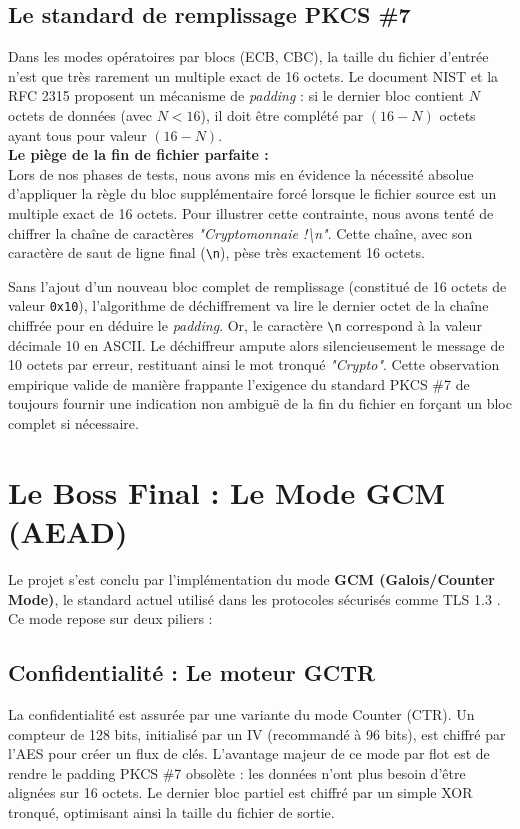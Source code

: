 \documentclass[12pt,a4paper]{article}
\begin{document}
\subsection{Le standard de remplissage PKCS \#7}
Dans les modes opératoires par blocs (ECB, CBC), la taille du fichier d'entrée n'est que très rarement un multiple exact de 16 octets. Le document NIST et la RFC 2315 \cite{rfc2315} proposent un mécanisme de \textit{padding} : si le dernier bloc contient $N$ octets de données (avec $N < 16$), il doit être complété par $(16 - N)$ octets ayant tous pour valeur $(16 - N)$.\\

\textbf{Le piège de la fin de fichier parfaite :}\\
Lors de nos phases de tests, nous avons mis en évidence la nécessité absolue d'appliquer la règle du bloc supplémentaire forcé lorsque le fichier source est un multiple exact de 16 octets. Pour illustrer cette contrainte, nous avons tenté de chiffrer la chaîne de caractères \textit{"Cryptomonnaie !\textbackslash n"}. Cette chaîne, avec son caractère de saut de ligne final (\texttt{\textbackslash n}), pèse très exactement 16 octets.

Sans l'ajout d'un nouveau bloc complet de remplissage (constitué de 16 octets de valeur \texttt{0x10}), l'algorithme de déchiffrement va lire le dernier octet de la chaîne chiffrée pour en déduire le \textit{padding}. Or, le caractère \texttt{\textbackslash n} correspond à la valeur décimale 10 en ASCII. Le déchiffreur ampute alors silencieusement le message de 10 octets par erreur, restituant ainsi le mot tronqué \textit{"Crypto"}. Cette observation empirique valide de manière frappante l'exigence du standard PKCS \#7 de toujours fournir une indication non ambiguë de la fin du fichier en forçant un bloc complet si nécessaire.

\section{Le Boss Final : Le Mode GCM (AEAD)}

Le projet s'est conclu par l'implémentation du mode \textbf{GCM (Galois/Counter Mode)}, le standard actuel utilisé dans les protocoles sécurisés comme TLS 1.3 \cite{sp80038d}. Ce mode repose sur deux piliers :

\subsection{Confidentialité : Le moteur GCTR}
La confidentialité est assurée par une variante du mode Counter (CTR). Un compteur de 128 bits, initialisé par un IV (recommandé à 96 bits), est chiffré par l'AES pour créer un flux de clés. L'avantage majeur de ce mode par flot est de rendre le padding PKCS \#7 obsolète : les données n'ont plus besoin d'être alignées sur 16 octets. Le dernier bloc partiel est chiffré par un simple XOR tronqué, optimisant ainsi la taille du fichier de sortie.
\end{document}
